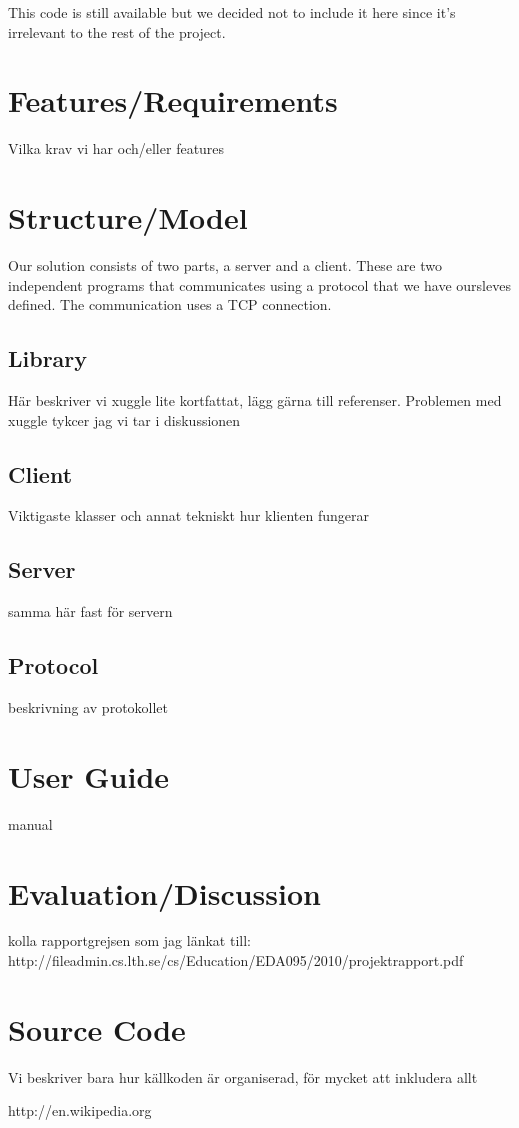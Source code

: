 \documentclass[a4paper]{article}
\begin{document}
This code is still available but we decided not to include it here since it's irrelevant to the rest of the project. 

\section{Features/Requirements}
Vilka krav vi har och/eller features

\section{Structure/Model}
Our solution consists of two parts, a server and a client. These are two independent programs that communicates using a protocol that we have oursleves defined. The communication uses a TCP connection.

\subsection{Library}
Här beskriver vi xuggle lite kortfattat, lägg gärna till referenser. Problemen med xuggle tykcer jag vi tar i diskussionen

\subsection{Client}
Viktigaste klasser och annat tekniskt hur klienten fungerar

\subsection{Server}
samma här fast för servern

\subsection{Protocol}
beskrivning av protokollet

\section{User Guide}
manual

\section{Evaluation/Discussion}
kolla rapportgrejsen som jag länkat till: http://fileadmin.cs.lth.se/cs/Education/EDA095/2010/projektrapport.pdf
\section{Source Code}
Vi beskriver bara hur källkoden är organiserad, för mycket att inkludera allt




\begin{thebibliography}{1}
http://en.wikipedia.org
\end{thebibliography}
\end{document}
